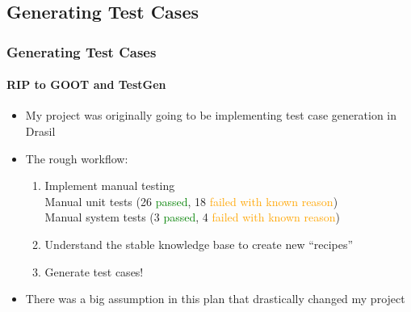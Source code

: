 \documentclass{beamer}
\begin{document}
\subsection{Generating Test Cases}

\begin{frame}
    \frametitle{Generating Test Cases}
    \framesubtitle{RIP to GOOT and TestGen}
    \begin{itemize}
        \item My project was originally going to be implementing
              test case generation in Drasil
        \item<2-> The rough workflow:
              \begin{enumerate}
                  \item<2-> Implement manual testing \\
                        Manual unit tests (26 \textcolor{green}{passed},
                        18 \textcolor{orange}{failed with known reason}) \\
                        Manual system tests (3 \textcolor{green}{passed},
                        4 \textcolor{orange}{failed with known reason})
                  \item<3-> Understand the {stable
                                knowledge base} to create new ``recipes''
                  \item<4-> Generate test cases!
              \end{enumerate}
        \item<5-> There was a big assumption in this plan that drastically
              changed my project
    \end{itemize}
\end{frame}


\end{document}
